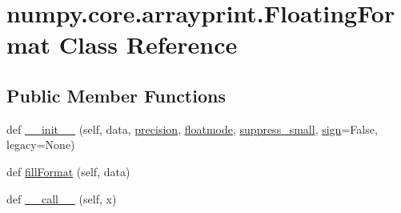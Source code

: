 \hypertarget{classnumpy_1_1core_1_1arrayprint_1_1FloatingFormat}{}\section{numpy.\+core.\+arrayprint.\+Floating\+Format Class Reference}
\label{classnumpy_1_1core_1_1arrayprint_1_1FloatingFormat}
\subsection*{Public Member Functions}
\begin{DoxyCompactItemize}
\item 
def \hyperlink{classnumpy_1_1core_1_1arrayprint_1_1FloatingFormat_addcfba3642fea417023a10ac94ccadb8}{\+\_\+\+\_\+init\+\_\+\+\_\+} (self, data, \hyperlink{classnumpy_1_1core_1_1arrayprint_1_1FloatingFormat_a4433af57d181fdcafc6da7a9454e1945}{precision}, \hyperlink{classnumpy_1_1core_1_1arrayprint_1_1FloatingFormat_a5c6295d9cfd715d5e1a06867eb596d3a}{floatmode}, \hyperlink{classnumpy_1_1core_1_1arrayprint_1_1FloatingFormat_a9f035c8b6949e5d9b92e8e4294202bdd}{suppress\+\_\+small}, \hyperlink{classnumpy_1_1core_1_1arrayprint_1_1FloatingFormat_ae5bbf6c196629a25b53df15cca5a3a1a}{sign}=False, legacy=None)
\item 
def \hyperlink{classnumpy_1_1core_1_1arrayprint_1_1FloatingFormat_a829a77421b66b6830eaf1bb8f747c76d}{fill\+Format} (self, data)
\item 
def \hyperlink{classnumpy_1_1core_1_1arrayprint_1_1FloatingFormat_a57069cbd155d3e64eccb6d37c4016694}{\+\_\+\+\_\+call\+\_\+\+\_\+} (self, x)
\end{DoxyCompactItemize}

